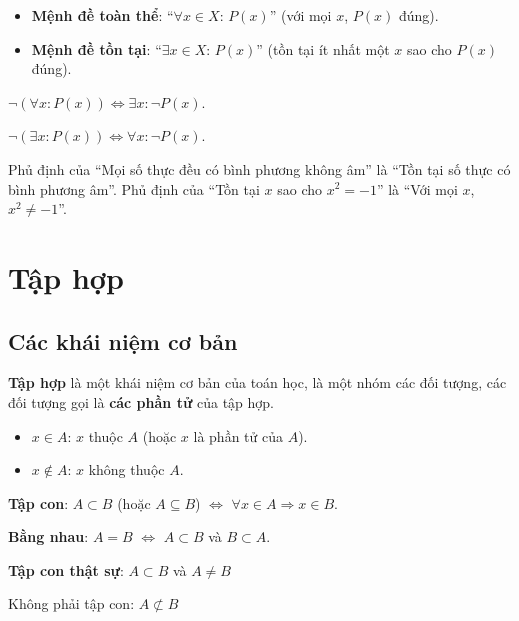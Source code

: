 \documentclass[12pt,a4paper]{article}
\begin{document}
\begin{dinhnghia}
  \begin{itemize}
    \item \textbf{Mệnh đề toàn thể}: ``$\forall x \in X$: $P(x)$'' (với mọi $x$, $P(x)$ đúng).
    \item \textbf{Mệnh đề tồn tại}: ``$\exists x \in X$: $P(x)$'' (tồn tại ít nhất một $x$ sao cho $P(x)$ đúng).
  \end{itemize}
\end{dinhnghia}

\begin{congthuc}[title={Phủ định}]
  $\neg(\forall x: P(x)) \Leftrightarrow \exists x: \neg P(x)$.
  
  $\neg(\exists x: P(x)) \Leftrightarrow \forall x: \neg P(x)$.
\end{congthuc}

\begin{vidu}
  Phủ định của ``Mọi số thực đều có bình phương không âm'' là ``Tồn tại số thực có bình phương âm''. Phủ định của ``Tồn tại $x$ sao cho $x^2 = -1$'' là ``Với mọi $x$, $x^2 \ne -1$''.
\end{vidu}

\section{Tập hợp}

\subsection{Các khái niệm cơ bản}

\begin{dinhnghia}
  \textbf{Tập hợp} là một khái niệm cơ bản của toán học, là một nhóm các đối tượng, các đối tượng gọi là \textbf{các phần tử} của tập hợp.
  \begin{itemize}
    \item $x \in A$: $x$ thuộc $A$ (hoặc $x$ là phần tử của $A$).
    \item $x \notin A$: $x$ không thuộc $A$.
  \end{itemize}
\end{dinhnghia}

\begin{dinhnghia}
  \textbf{Tập con}: $A \subset B$ (hoặc $A \subseteq B$) $\Leftrightarrow$ $\forall x \in A \Rightarrow x \in B$.
  
  \textbf{Bằng nhau}: $A = B$ $\Leftrightarrow$ $A \subset B$ và $B \subset A$.

  \textbf{Tập con thật sự}: $A \subset B$ và $A \ne B$

  Không phải tập con: $A \not \subset B$
\end{dinhnghia}
\end{document}
